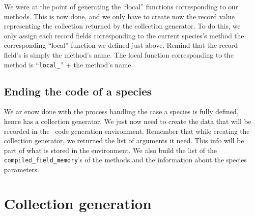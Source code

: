 We were at the point of generating the ``local'' functions
corresponding to our methods. This is now done, and we only have to
create now the record value representing the collection returned by
the collection generator. To do this, we only assign each record
fields corresponding to the current species's method the corresponding
``local'' function we defined just above. Remind that the record
field's is simply the method's name. The local function corresponding
to the method is ``{\tt local\_}'' + the method's name.


\subsection{Ending the code of a species}
We ar enow done with the process handling the case a species is fully
defined, hence has a collection generator. We just now need to create
the data that will be recorded in the \ocaml\ code generation
environment. Remember that while creating the collection generator, we
returned the list of arguments it need. This info will be part of what
is stored in the environment. We also build the list of the
{\tt compiled\_field\_memory}'s of the methods and the information
about the species parameters.


\section{Collection generation}
